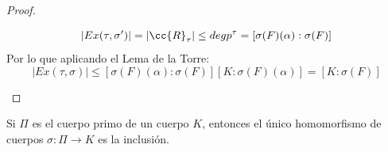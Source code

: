 \begin{prop}
\begin{proof}
\begin{itemize}
\begin{equation*}
                    |Ex(\tau, \sigma')| = |\cc{R}_\tau| \leq degp^\tau = [\sigma(F)(\alpha):\sigma(F)]
                \end{equation*}
                Por lo que aplicando el Lema de la Torre:
                \begin{equation*}
                    |Ex(\tau,\sigma)|  \leq [\sigma(F)(\alpha):\sigma(F)][K:\sigma(F)(\alpha)] = [K:\sigma(F)]
                \end{equation*}\qedhere
        \end{itemize}
    \end{proof}
\end{prop}

\begin{ejercicio} \label{ej:homomorfismo_primo}
    Si $\Pi$ es el cuerpo primo de un cuerpo $K$, entonces el único homomorfismo de cuerpos $\sigma:\Pi\to K$ es la inclusión.\\ 


\end{ejercicio}
